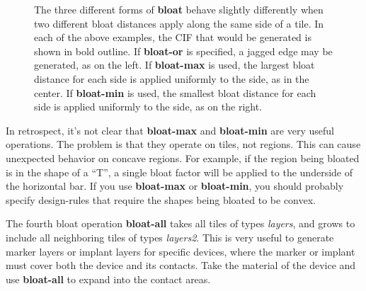 \documentclass[letterpaper,twoside,12pt]{article}
\begin{document}
\begin{figure}[ht]
   \begin{center}
      \caption{The three different forms of {\bfseries bloat} behave
	slightly differently when two different bloat distances apply
	along the same side of a tile.  In each of the above examples,
	the CIF that would be generated is shown in bold outline.
	If {\bfseries bloat-or} is specified, a jagged edge may
	be generated, as on the left.  If {\bfseries bloat-max} is used,
	the largest bloat distance for each side is applied uniformly to
	the side, as in the center.  If {\bfseries bloat-min} is used, the
	smallest bloat distance for each side is applied uniformly to the
	side, as on the right.}
   \end{center}
   \label{bloat}
\end{figure}

In retrospect, it's not clear that {\bfseries bloat-max} and {\bfseries bloat-min}
are very useful operations.  The problem is that they operate on tiles,
not regions.  This can cause unexpected behavior on concave regions.
For example, if the region being bloated is in the shape of a ``T'', a
single bloat factor will be applied to the underside of the horizontal
bar.  If you use {\bfseries bloat-max} or {\bfseries bloat-min}, you should
probably specify design-rules that require the shapes being bloated to
be convex.

The fourth bloat operation {\bfseries bloat-all} takes all tiles of
types {\itshape layers}, and grows to include all neighboring tiles of
types {\itshape layers2}.  This is very useful to generate marker layers
or implant layers for specific devices, where the marker or implant must
cover both the device and its contacts.  Take the material of the device
and use {\bfseries bloat-all} to expand into the contact areas.
\end{document}
